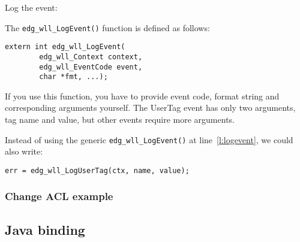 Log the event:


The \verb'edg_wll_LogEvent()' function is defined as follows:
\begin{lstlisting}[numbers=none]
extern int edg_wll_LogEvent(
        edg_wll_Context context,
        edg_wll_EventCode event,
        char *fmt, ...);
\end{lstlisting}
If you use this function, you have to provide event code, format
string and corresponding arguments yourself. The UserTag event has
only two arguments, tag name and value, but other events require more
arguments.

Instead of using the generic \verb'edg_wll_LogEvent()' at line~\ref{l:logevent}, we could also
write:
\begin{lstlisting}
err = edg_wll_LogUserTag(ctx, name, value);
\end{lstlisting}


\subsubsection{Change ACL example}



\subsection{Java binding}

